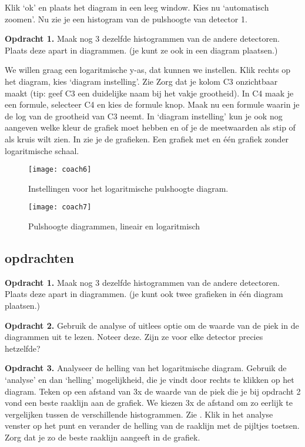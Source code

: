 Klik `ok' en plaats het diagram in een leeg window. Kies nu `automatisch zoomen'.
Nu zie je een histogram van de pulshoogte van detector 1.

\textbf{Opdracht 1.}
Maak nog 3 dezelfde histogrammen van de andere detectoren. Plaats deze apart in diagrammen.
(je kunt ze ook in een diagram plaatsen.)

We willen graag een logaritmische y-as, dat kunnen we instellen.
Klik rechts op het diagram, kies `diagram instelling'. Zie 
Zorg dat je kolom C3 onzichtbaar maakt (tip: geef C3 een duidelijke naam bij het vakje
grootheid). In C4 maak je een formule, selecteer C4 en kies de formule knop.
Maak nu een formule waarin je de log van de grootheid van C3 neemt.
In `diagram instelling' kun je ook nog aangeven welke kleur de grafiek moet hebben en
of je de meetwaarden als stip of als kruis wilt zien. In  zie je
de grafieken. Een grafiek met en één grafiek zonder logaritmische schaal.


\begin{figure}
    \centering
    \texttt{[image: coach6]}
    \caption{Instellingen voor het logaritmische pulshoogte diagram.}
    \label{fig:coach6}
\end{figure}

\begin{figure}
    \centering
    \texttt{[image: coach7]}
    \caption{Pulshoogte diagrammen, lineair en logaritmisch}
    \label{fig:coach7}
\end{figure}


\subsection{opdrachten}
\label{sec:opdrachten}

\textbf{Opdracht 1.}
Maak nog 3 dezelfde histogrammen van de andere detectoren. Plaats deze apart in diagrammen.
(je kunt ook twee grafieken in één diagram plaatsen.)

\textbf{Opdracht 2.}
Gebruik de analyse of uitlees optie om de waarde van de piek in de diagrammen
uit te lezen. Noteer deze. Zijn ze voor elke detector precies hetzelfde?

\textbf{Opdracht 3.}
Analyseer de helling van het logaritmische diagram. Gebruik de `analyse' en dan `helling'
mogelijkheid, die je vindt door rechts te klikken op het diagram.
Teken op een afstand van 3x de waarde van de piek die je bij opdracht 2 vond een beste raaklijn aan de
grafiek. We kiezen 3x de afstand om zo eerlijk te vergelijken tussen de verschillende
histogrammen. Zie . Klik in het analyse venster op het punt en verander
de helling van de raaklijn met de pijltjes toetsen. Zorg dat je zo de beste raaklijn aangeeft in de grafiek.

